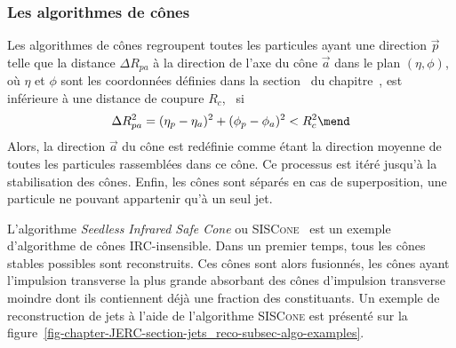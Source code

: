 \subsubsection{Les algorithmes de cônes}
Les algorithmes de cônes regroupent toutes les particules ayant une direction $\vec{p}$ telle que la distance $\Delta R_{pa}$ à la direction de l'axe du cône $\vec{a}$ dans le plan $(\eta,\phi)$, où $\eta$ et $\phi$ sont les coordonnées définies dans la section~ du chapitre~, est inférieure à une distance de coupure $R_c$, \ie\ si
\begin{equation}
\Delta R_{pa} ^2 = (\eta_p - \eta_a)^2 + (\phi_p - \phi_a)^2 < R_c^2
\mend
\end{equation}
Alors, la direction $\vec{a}$ du cône est redéfinie comme étant la direction moyenne de toutes les particules rassemblées dans ce cône. Ce processus est itéré jusqu'à la stabilisation des cônes.
Enfin, les cônes sont séparés en cas de superposition, une particule ne pouvant appartenir qu'à un seul jet.
\par L'algorithme \emph{Seedless Infrared Safe Cone} ou \textsc{SISCone}~\cite{SISCone} est un exemple d'algorithme de cônes IRC-insensible.
Dans un premier temps, tous les cônes stables possibles sont reconstruits.
Ces cônes sont alors fusionnés, les cônes ayant l'impulsion transverse la plus grande absorbant des cônes d'impulsion transverse moindre dont ils contiennent déjà une fraction des constituants.
Un exemple de reconstruction de jets à l'aide de l'algorithme \textsc{SISCone} est présenté sur la figure~\ref{fig-chapter-JERC-section-jets_reco-subsec-algo-examples}.

